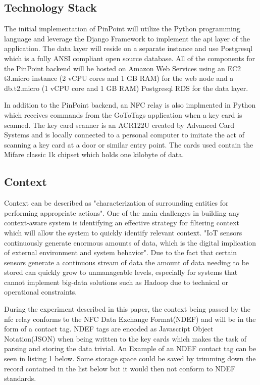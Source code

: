 \documentclass[11pt,journal]{IEEEtran}
\begin{document}
\subsection{Technology Stack}
The initial implementation of PinPoint will utilize the Python\cite{python} programming language and leverage the Django Framework\cite{django} to implement the api layer of the application.  The data layer will reside on a separate instance and use Postgresql\cite{postgresql} which is a fully ANSI compliant open source database.  All of the components for the PinPoint backend will be hosted on Amazon Web Services\cite{aws} using an EC2 t3.micro instance (2 vCPU cores and 1 GB RAM) for the web node and a db.t2.micro (1 vCPU core and 1 GB RAM) Postgresql RDS for the data layer.

In addition to the PinPoint backend, an NFC relay is also implmented in Python which receives commands from the GoToTags\cite{gototags} application when a key card is scanned.  The key card scanner is an ACR122U created by Advanced Card Systems\cite{acr122u} and is locally connected to a personal computer to imitate the act of scanning a key card at a door or similar entry point.  The cards used contain the Mifare classic 1k chipset which holds one kilobyte of data.   

\subsection{Context}
Context can be described as "characterization of surrounding entities for performing appropriate actions".\cite{mahalle2013identity} One of the main challenges in building any context-aware system is identifying an effective strategy for filtering context which will allow the system to quickly identify relevant context.  "IoT sensors continuously generate enormous amounts of data, which is the digital implication of external environment and system behavior".\cite{Song:2018:TIC:3180374.3181341}  Due to the fact that certain sensors generate a continuous stream of data the amount of data needing to be stored can quickly grow to unmanageable levels, especially for systems that cannot implement big-data solutions such as Hadoop due to technical or operational constraints.

During the experiment described in this paper, the context being passed by the nfc relay conforms to the NFC Data Exchange Format(NDEF) and will be in the form of a contact tag. NDEF tags are encoded as Javascript Object Notation(JSON) when being written to the key cards which makes the task of parsing and storing the data trivial. An Example of an NDEF contact tag can be seen in listing 1 below.  Some storage space could be saved by trimming down the record contained in the list below but it would then not conform to NDEF standards.
\end{document}
